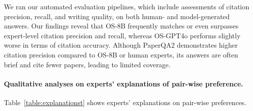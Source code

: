 We ran our automated evaluation pipelines, which include assessments of citation precision, recall, and writing quality, on both human- and model-generated answers. Our findings reveal that OS-8B frequently matches or even surpasses expert-level citation precision and recall, whereas OS-GPT4o performs slightly worse in terms of citation accuracy. Although PaperQA2 demonstrates higher citation precision compared to OS-8B or human experts, its answers are often brief and cite fewer papers, leading to limited coverage.






\paragraph{Qualitative analyses on experts' explanations of pair-wise preference. }
Table~\ref{table:explanationst} shows experts' explanations on pair-wise preferences. 


